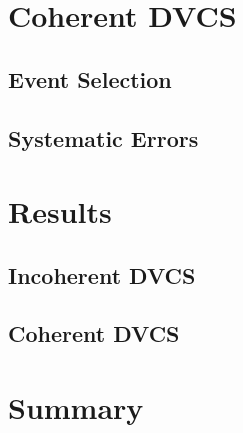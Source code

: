 \documentclass[aps,prc,preprint,superscriptaddress]{revtex4-1}
\begin{document}
\section{Coherent DVCS}

  \subsection{Event Selection}

  \subsection{Systematic Errors}

\section{Results}

  \subsection{Incoherent DVCS}

  \subsection{Coherent DVCS}

\section{Summary}


\end{document}
